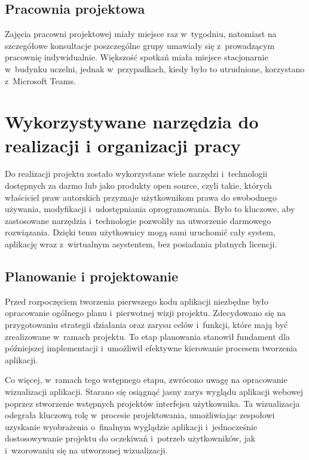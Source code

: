 \subsection{Pracownia projektowa}
Zajęcia pracowni projektowej miały miejsce raz w~tygodniu, natomiast na szczegółowe konsultacje
poszczególne grupy umawiały się z~prowadzącym pracownię indywidualnie. Większość spotkań miała
miejsce stacjonarnie w~budynku uczelni, jednak w~przypadkach, kiedy było to utrudnione, korzystano
z~Microsoft Teams.



\section{Wykorzystywane narzędzia do realizacji i organizacji pracy}

Do realizacji projektu zostało wykorzystane wiele narzędzi i~technologii
dostępnych za darmo lub jako produkty open source, czyli takie,
których właściciel praw autorskich przyznaje użytkownikom prawa
do swobodnego używania, modyfikacji i~udostępniania oprogramowania.
Było to kluczowe, aby zastosowane narzędzia i~technologie pozwoliły
na utworzenie darmowego rozwiązania. Dzięki temu użytkownicy
mogą sami uruchomić cały system, aplikację wraz z~wirtualnym
asystentem, bez posiadania płatnych licencji.


\subsection{Planowanie i projektowanie}

Przed rozpoczęciem tworzenia pierwszego kodu aplikacji niezbędne było
opracowanie ogólnego planu i~pierwotnej wizji projektu. Zdecydowano
się na przygotowaniu strategii działania oraz
zarysu celów i~funkcji, które mają być zrealizowane w~ramach projektu.
To etap planowania stanowił fundament dla późniejszej implementacji
i~umożliwił efektywne kierowanie procesem tworzenia aplikacji.

Co więcej, w~ramach tego wstępnego etapu, zwrócono uwagę na
opracowanie wizualizacji aplikacji. Starano się osiągnąć jasny
zarys wyglądu aplikacji webowej poprzez stworzenie wstępnych projektów
interfejsu użytkownika. Ta wizualizacja odegrała kluczową rolę
w~procesie projektowania, umożliwiając zespołowi uzyskanie wyobrażenia
o~finalnym wyglądzie aplikacji i~jednocześnie dostosowywanie projektu
do oczekiwań i~potrzeb użytkowników, jak i~wzorowaniu się na utworzonej
wizualizacji.


